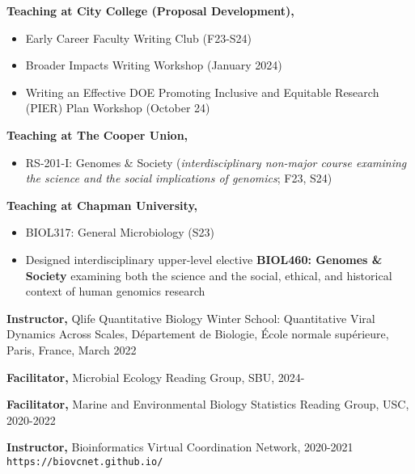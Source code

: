 \documentclass[]{res}
\begin{document}
\begin{resume}
\newpage

{\bf Teaching at City College (Proposal Development),} 
\begin{itemize} \itemsep -2pt
\item Early Career Faculty Writing Club (F23-S24)
\item Broader Impacts Writing Workshop (January 2024)
\item Writing an Effective DOE Promoting Inclusive and Equitable Research (PIER) Plan Workshop (October 24)
\end{itemize}


{\bf Teaching at The Cooper Union,} 
\begin{itemize} \itemsep -2pt
\item RS-201-I: Genomes \& Society (\emph{interdisciplinary non-major course examining the science and the social implications of genomics}; F23, S24)
\end{itemize}

{\bf Teaching at Chapman University,} 
\begin{itemize} \itemsep -2pt
\item BIOL317: General Microbiology (S23)
\item Designed interdisciplinary upper-level elective {\bf BIOL460: Genomes \& Society} examining both the science and the social, ethical, and historical context of human genomics research
\end{itemize}

{\bf Instructor,} Qlife Quantitative Biology Winter School: Quantitative Viral Dynamics Across Scales, D\'{e}partement de Biologie, \'{E}cole normale sup\'{e}rieure, Paris, France, March 2022

{\bf Facilitator,} {Microbial Ecology Reading Group}, SBU, 2024-

{\bf Facilitator,} {Marine and Environmental Biology Statistics Reading Group}, USC, 2020-2022

{\bf Instructor,} Bioinformatics Virtual Coordination Network, 2020-2021\\
\verb|https://biovcnet.github.io/|


\end{resume}
\end{document}
